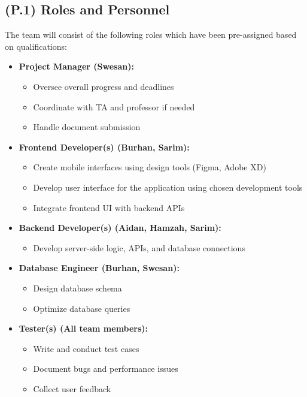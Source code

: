 \documentclass[12pt,letterpaper]{article}
\begin{document}
\subsection{(P.1) Roles and Personnel}
The team will consist of the following roles which have been pre-assigned based on qualifications:
\begin{itemize}
  \item \textbf{Project Manager (Swesan):}
  \begin{itemize}
      \item Oversee overall progress and deadlines
      \item Coordinate with TA and professor if needed
      \item Handle document submission
  \end{itemize}

  \item \textbf{Frontend Developer(s) (Burhan, Sarim):}
  \begin{itemize}
      \item Create mobile interfaces using design tools (Figma, Adobe XD)
      \item Develop user interface for the application using chosen development tools
      \item Integrate frontend UI with backend APIs
  \end{itemize}

  \item \textbf{Backend Developer(s) (Aidan, Hamzah, Sarim):}
  \begin{itemize}
      \item Develop server-side logic, APIs, and database connections
  \end{itemize}

  \item \textbf{Database Engineer (Burhan, Swesan):}
  \begin{itemize}
      \item Design database schema
      \item Optimize database queries
  \end{itemize}

  \item \textbf{Tester(s) (All team members):}
  \begin{itemize}
      \item Write and conduct test cases
      \item Document bugs and performance issues
      \item Collect user feedback
  \end{itemize}
\end{itemize}
\end{document}
